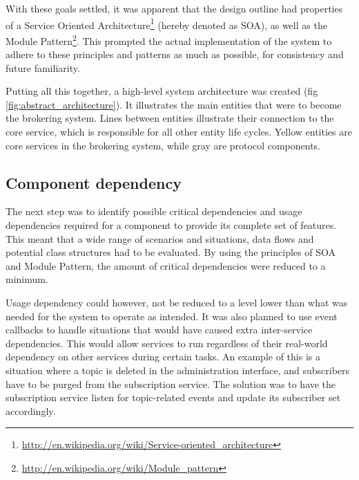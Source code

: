 With these goals settled, it was apparent that the design outline had properties of a Service Oriented Architecture\footnote{\url{http://en.wikipedia.org/wiki/Service-oriented_architecture}} (hereby denoted as SOA), as well as the Module Pattern\footnote{\url{http://en.wikipedia.org/wiki/Module_pattern}}. This prompted the actual implementation of the system to adhere to these principles and patterns as much as possible, for consistency and future familiarity.

Putting all this together, a high-level system architecture was created (fig \ref{fig:abstract_architecture}). It illustrates the main entities that were to become the brokering system. Lines between entities illustrate their connection to the core service, which is responsible for all other entity life cycles. Yellow entities are core services in the brokering system, while gray are protocol components.

\subsection{Component dependency}
\label{subsec:architecture_and_implementation-broker_architecture-component_dependency}

The next step was to identify possible critical dependencies and usage dependencies required for a component to provide its complete set of features. This meant that a wide range of scenarios and situations, data flows and potential class structures had to be evaluated. By using the principles of SOA and Module Pattern, the amount of critical dependencies were reduced to a minimum.

Usage dependency could however, not be reduced to a level lower than what was needed for the system to operate as intended. It was also planned to use event callbacks to handle situations that would have caused extra inter-service dependencies. This would allow services to run regardless of their real-world dependency on other services during certain tasks. An example of this is a situation where a topic is deleted in the administration interface, and subscribers have to be purged from the subscription service. The solution was to have the subscription service listen for topic-related events and update its subscriber set accordingly.

